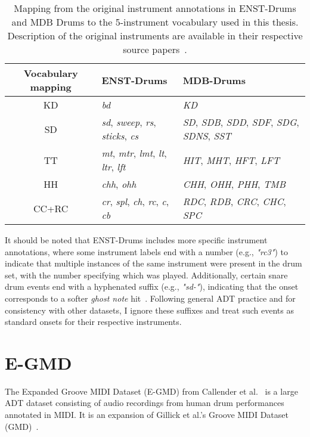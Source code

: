 \begin{table}[H]
    \centering
    \hspace*{-0.6cm}
    \begin{tabular}{c|ll}
        Vocabulary mapping & ENST-Drums & MDB-Drums \\
        \hline
        \acrfull{KD} & \textit{bd} & \textit{KD} \\
        \acrfull{SD} & \textit{sd}, \textit{sweep}, \textit{rs}, \textit{sticks}, \textit{cs} & \textit{SD}, \textit{SDB}, \textit{SDD}, \textit{SDF}, \textit{SDG}, \textit{SDNS}, \textit{SST} \\
        \acrfull{TT} & \textit{mt}, \textit{mtr}, \textit{lmt}, \textit{lt}, \textit{ltr}, \textit{lft} & \textit{HIT}, \textit{MHT}, \textit{HFT}, \textit{LFT} \\
        \acrfull{HH} & \textit{chh}, \textit{ohh} & \textit{CHH}, \textit{OHH}, \textit{PHH}, \textit{TMB} \\
        \acrfull{CC+RC} & \textit{cr}, \textit{spl}, \textit{ch}, \textit{rc}, \textit{c}, \textit{cb} & \textit{RDC}, \textit{RDB}, \textit{CRC}, \textit{CHC}, \textit{SPC} \\
    \end{tabular}
    \caption{Mapping from the original instrument annotations in ENST-Drums and MDB Drums to the 5-instrument vocabulary used in this thesis. Description of the original instruments are available in their respective source papers~\cite{gillet2006enst, southall2017mdb}.}
    \label{ENSTMDBMapping}
\end{table}

It should be noted that ENST-Drums includes more specific instrument annotations, where some instrument labels end with a number (e.g., \textit{"rc3"}) to indicate that multiple instances of the same instrument were present in the drum set, with the number specifying which was played. Additionally, certain snare drum events end with a hyphenated suffix (e.g., \textit{"sd-"}), indicating that the onset corresponds to a softer \textit{ghost note} hit~\cite{gillet2006enst}. Following general \gls{ADT} practice and for consistency with other datasets, I ignore these suffixes and treat such events as standard onsets for their respective instruments.

\section{E-GMD}

The Expanded Groove MIDI Dataset (E-GMD) from Callender et al.~\cite{callender2020improvingperceptualqualitydrum} is a large \gls{ADT} dataset consisting of audio recordings from human drum performances annotated in MIDI. It is an expansion of Gillick et al.'s Groove MIDI Dataset (GMD)~\cite{pmlr-v97-gillick19a}.

